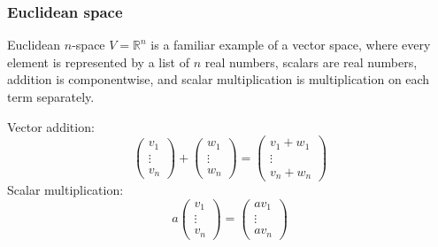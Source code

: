 \documentclass[10pt]{beamer}
\begin{document}
\begin{frame}
  \frametitle{Euclidean space}
  Euclidean $n$-space $V = \mathbb{R}^n$ is a familiar example of a vector space, where every element is represented by a list of $n$ real numbers, scalars are real numbers, addition is componentwise, and scalar multiplication is multiplication on each term  separately.
  
  Vector addition:
  \begin{equation*}
    \begin{pmatrix} v_1 \\ \vdots \\ v_n \end{pmatrix} + \begin{pmatrix} w_1 \\ \vdots \\ w_n \end{pmatrix}
    = \begin{pmatrix} v_1 + w_1 \\ \vdots \\ v_n + w_n \end{pmatrix}
  \end{equation*}
  Scalar multiplication:
  \begin{equation*}
    a \begin{pmatrix} v_1 \\ \vdots \\ v_n \end{pmatrix} = \begin{pmatrix} a v_1 \\ \vdots \\ a v_n \end{pmatrix}
  \end{equation*}
  
\end{frame}
\end{document}
